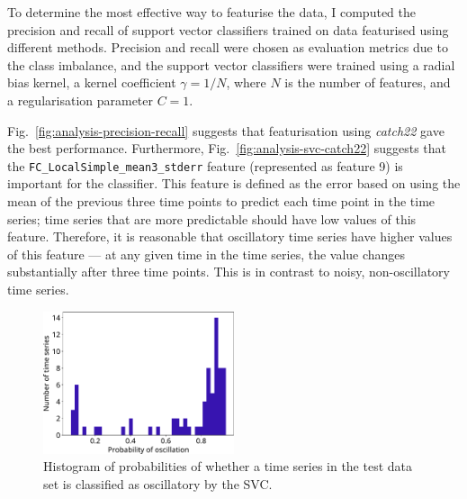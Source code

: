To determine the most effective way to featurise the data, I computed the precision and recall of support vector classifiers trained on data featurised using different methods.
Precision and recall were chosen as evaluation metrics due to the class imbalance, and the support vector classifiers were trained using a radial bias kernel, a kernel coefficient $\gamma = 1/N$, where $N$ is the number of features, and a regularisation parameter $C = 1$.

Fig.\ \ref{fig:analysis-precision-recall} suggests that featurisation using \textit{catch22} gave the best performance.
Furthermore, Fig.\ \ref{fig:analysis-svc-catch22} suggests that the \texttt{FC\_LocalSimple\_mean3\_stderr} feature (represented as feature 9) is important for the classifier.
This feature is defined as the error based on using the mean of the previous three time points to predict each time point in the time series; time series that are more predictable should have low values of this feature.
Therefore, it is reasonable that oscillatory time series have higher values of this feature --- at any given time in the time series, the value changes substantially after three time points.
This is in contrast to noisy, non-oscillatory time series.


\begin{figure}
  \centering
  \includegraphics[width=0.5\textwidth]{classifier_histogram_probabilities_adapted}
  \caption{
    Histogram of probabilities of whether a time series in the test data set is classified as oscillatory by the SVC.
  }
  \label{fig:analysis-svc-proba-histogram}
\end{figure}


